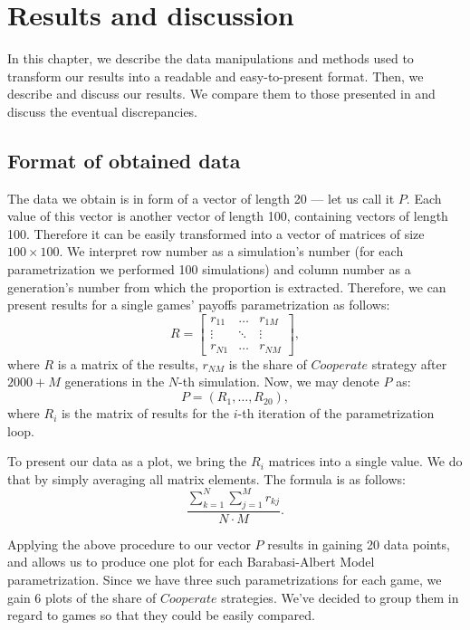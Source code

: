 \documentclass[english, twoside, 12pt, a4paper]{article}
\theoremstyle{definition}
\theoremstyle{plain}
\theoremstyle{remark}
\begin{document}
\clearpage
\section{Results and discussion}

In this chapter, we describe the data manipulations and methods used to transform our results into a readable and easy-to-present format. Then, we describe and discuss our results. We compare them to those presented in \cite{santos2005scale} and discuss the eventual discrepancies. 

\subsection{Format of obtained data}

The data we obtain is in form of a vector of length 20 --- let us call it $P$. Each value of this vector is another vector of length 100, containing vectors of length 100. Therefore it can be easily transformed into a vector of matrices of size $100 \times 100$. We interpret row number as a simulation's number (for each parametrization we performed 100 simulations) and column number as a generation's number from which the proportion is extracted. Therefore, we can present results for a single games' payoffs parametrization as follows:
\[
R = \begin{bmatrix} 
    r_{11} & \dots & r_{1M} \\
    \vdots & \ddots & \vdots \\
    r_{N1} &  \dots      & r_{NM} 
    \end{bmatrix}
,\]
where $R$ is a matrix of the results, $r_{NM}$ is the share of $Cooperate$ strategy after $2000 + M$ generations in the $N$-th simulation. Now, we may denote $P$ as:
\[
  P = (R_1, \dots, R_{20}),
\]
where $R_i$ is the matrix of results for the \(i\)-th iteration of the parametrization loop.

To present our data as a plot, we bring the $R_i$ matrices into a single value. We do that by simply averaging all matrix elements. The formula is as follows:
\[
  \frac{\sum_{k=1}^{N}\sum_{j=1}^{M} r_{kj}}{N \cdot M} .
\] 

Applying the above procedure to our vector \( P\) results in gaining 20 data points, and allows us to produce one plot for each Barabasi-Albert Model parametrization. Since we have three such parametrizations for each game, we gain 6 plots of the share of $Cooperate$ strategies. We've decided to group them in regard to games so that they could be easily compared. 
\end{document}
